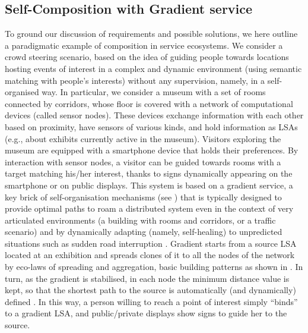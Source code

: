 \documentclass[12pt,a4paper,twoside,openright]{book}
\begin{document}
\subsection{Self-Composition with Gradient service}
\label{sec:gradcomp}
To ground our discussion of requirements and possible solutions, we here outline a paradigmatic example of composition in service ecosystems.
%
We consider a crowd steering scenario, based on the idea of guiding people towards locations hosting events of interest in a complex and dynamic environment (using semantic matching with people's interests) without any supervision, namely, in a self-organised way.
%
In particular, we consider a museum with a set of rooms connected by corridors, whose floor is covered with a network of computational devices (called sensor nodes).
%
These devices exchange information with each other based on proximity, have sensors of various kinds, and hold information as LSAs (e.g., about exhibits currently active in the museum).
%
Visitors exploring the museum are equipped with a smartphone device that holds their preferences. By interaction with sensor nodes, a visitor can be guided towards rooms with a target matching his/her interest, thanks to signs dynamically appearing on the smartphone or on public displays. 
%
This system is based on a gradient service, a key brick of self-organisation mechanisms (see ) that is typically designed to provide optimal paths to roam a distributed system even in the context of very articulated environments (a building with rooms and corridors, or a traffic scenario) and by dynamically adapting (namely, self-healing) to unpredicted situations such as sudden road interruption \cite{FDMVA-NACO2012,biocore}.
%
Gradient starts from a source LSA located at an exhibition and spreads clones of it to all the nodes of the network by eco-laws of spreading and aggregation, basic building patterns as shown in .
%
In turn, as the gradient is stabilised, in each node the minimum distance value is kept, so that the shortest path to the source is automatically (and dynamically) defined \cite{mass2011}.
%
In this way, a person willing to reach a point of interest simply ``binds'' to a gradient LSA, and public/private displays show signs to guide her to the source.
\end{document}
